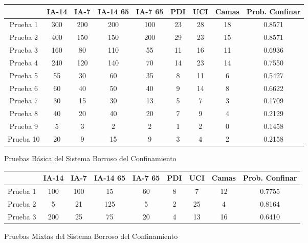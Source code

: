 \documentclass[12pt,a4paper, xcolor=table]{article}
\begin{document}
    \begin{figure}[!h]
      \centering
    \begin{tabular}{c|c|c|c|c|c|c|c|c|}
      \cline{2-9}
                                    & IA-14 & IA-7 & IA-14 65 & IA-7 65 & PDI & UCI & Camas & \textbf{Prob. Confinar} \\ \hline
    \multicolumn{1}{|c|}{Prueba 1} & 300 & 200 & 200 & 100 & 23 & 28 & 18 & 0.8571 \\ \hline
    \multicolumn{1}{|c|}{Prueba 2} & 400 & 150 & 150 & 200 & 29 & 23 & 15 & 0.8571 \\ \hline
    \multicolumn{1}{|c|}{Prueba 3} & 160 & 80 & 110 & 55 & 11 & 16 & 11 & 0.6936 \\ \hline
    \multicolumn{1}{|c|}{Prueba 4} & 240 & 120 & 140 & 70 & 14 & 23 & 14 & 0.7550 \\ \hline
    \multicolumn{1}{|c|}{Prueba 5} & 55 & 30 & 60 & 35 & 8 & 11 & 6 & 0.5427 \\ \hline
    \multicolumn{1}{|c|}{Prueba 6} & 60 & 40 & 50 & 40 & 9 & 14 & 8 & 0.6622 \\ \hline
    \multicolumn{1}{|c|}{Prueba 7} & 30 & 15 & 30 & 13 & 5 & 7 & 3 & 0.1709 \\ \hline
    \multicolumn{1}{|c|}{Prueba 8} & 40 & 20 & 40 & 20 & 7 & 9 & 4 & 0.2129 \\ \hline
    \multicolumn{1}{|c|}{Prueba 9} & 5 & 3 & 2 & 2 & 1 & 2 & 0 & 0.1458 \\ \hline
    \multicolumn{1}{|c|}{Prueba 10} & 20 & 9 & 15 & 9 & 3 & 4 & 2 & 0.2158 \\ \hline
    \end{tabular}
    \caption{Pruebas Básica del Sistema Borroso del Confinamiento}
  \end{figure}


    \begin{figure}[!h]
      \centering
    \begin{tabular}{c|c|c|c|c|c|c|c|c|}
      \cline{2-9}
                                    & IA-14 & IA-7 & IA-14 65 & IA-7 65 & PDI & UCI & Camas & \textbf{Prob. Confinar} \\ \hline
    \multicolumn{1}{|c|}{Prueba 1} & 100 & 100 & 15 & 60 & 8 & 7 & 12 & 0.7755 \\ \hline
    \multicolumn{1}{|c|}{Prueba 2} & 5 & 21 & 125 & 5 & 2 & 25 & 4 & 0.8164 \\ \hline
    \multicolumn{1}{|c|}{Prueba 3} & 200 & 25 & 75 & 20 & 4 & 13 & 16 & 0.6410 \\ \hline
    \end{tabular}
    \caption{Pruebas Mixtas del Sistema Borroso del Confinamiento}
  \end{figure}
\end{document}
